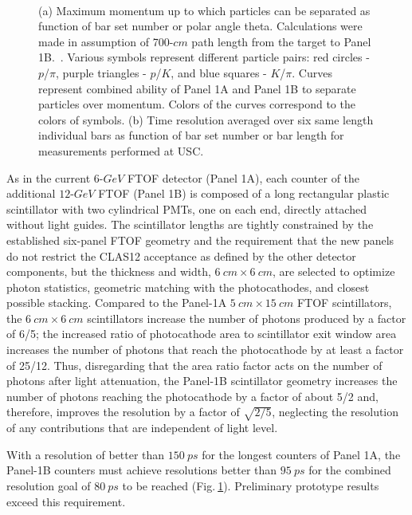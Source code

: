 \begin{figure}[h!]
\centering
\mbox{\quad
{}}
\caption{(a) Maximum momentum up to which particles can be separated as function of bar set number or polar angle theta. Calculations were made in assumption of 700-$cm$ path length from the target to Panel 1B.~\cite{tdr}. Various symbols represent different particle pairs:  red circles - $p$/$\pi$, purple triangles - $p$/$K$, and  blue squares - $K$/$\pi$. Curves represent combined ability of Panel 1A and Panel 1B to separate particles over momentum. Colors of the curves correspond to the colors of symbols. (b) Time resolution averaged over six same length individual bars as function of bar set number or bar length for measurements performed at USC. \label{fig:partIdReq}\label{fig:resLength}}
\end{figure}

As in the current $6$-$GeV$ FTOF detector (Panel 1A), each counter of the additional $12$-$GeV$ FTOF (Panel 1B) is composed of a long rectangular plastic scintillator with two cylindrical PMTs, one on each end, directly attached without light guides. The scintillator lengths are tightly constrained by the established six-panel FTOF geometry and the requirement that the new panels do not  restrict the CLAS12 acceptance as defined by the other detector components, but the thickness and width, $6\:cm \times 6\:cm$, are selected to optimize photon statistics, geometric matching with the photocathodes, and closest possible stacking. Compared to the Panel-1A $5\:cm \times 15\:cm$ FTOF scintillators, the $6\:cm \times 6\:cm$ scintillators increase the number of photons produced by a factor of 6/5; the increased ratio of photocathode area to scintillator exit window area increases the number of photons that reach the photocathode by at least a factor of 25/12.  Thus, disregarding that the area ratio factor acts on the number of photons after light attenuation, the Panel-1B scintillator geometry increases the number of photons reaching the photocathode by a factor of about 5/2 and, therefore, improves the resolution by a factor of $\sqrt{2/5}$, neglecting the resolution of any contributions that are independent of light level.

With a resolution of better than $150\:ps$ for the longest counters of Panel 1A, the Panel-1B counters must achieve resolutions better than $95\:ps$ for the combined resolution goal of $80\:ps$ to be reached (Fig.$\:$\ref{fig:resLength}). Preliminary prototype results exceed this requirement.
